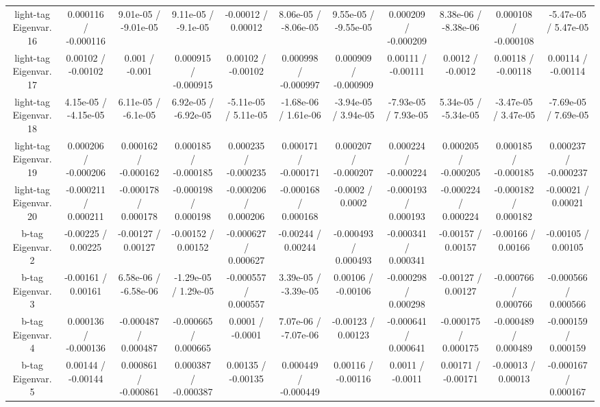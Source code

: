 \begin{table}[htbp]
\begin{center}
\begin{tabular}{|c|c|c|c|c|c|c|c|c|c|c|}
  light-tag Eigenvar. 16 & 0.000116 / -0.000116 & 9.01e-05 / -9.01e-05 & 9.11e-05 / -9.1e-05 & -0.00012 / 0.00012 & 8.06e-05 / -8.06e-05 & 9.55e-05 / -9.55e-05 & 0.000209 / -0.000209 & 8.38e-06 / -8.38e-06 & 0.000108 / -0.000108 & -5.47e-05 / 5.47e-05 \\ 
  light-tag Eigenvar. 17 & 0.00102 / -0.00102 & 0.001 / -0.001 & 0.000915 / -0.000915 & 0.00102 / -0.00102 & 0.000998 / -0.000997 & 0.000909 / -0.000909 & 0.00111 / -0.00111 & 0.0012 / -0.0012 & 0.00118 / -0.00118 & 0.00114 / -0.00114 \\ 
  light-tag Eigenvar. 18 & 4.15e-05 / -4.15e-05 & 6.11e-05 / -6.1e-05 & 6.92e-05 / -6.92e-05 & -5.11e-05 / 5.11e-05 & -1.68e-06 / 1.61e-06 & -3.94e-05 / 3.94e-05 & -7.93e-05 / 7.93e-05 & 5.34e-05 / -5.34e-05 & -3.47e-05 / 3.47e-05 & -7.69e-05 / 7.69e-05 \\ 
  light-tag Eigenvar. 19 & 0.000206 / -0.000206 & 0.000162 / -0.000162 & 0.000185 / -0.000185 & 0.000235 / -0.000235 & 0.000171 / -0.000171 & 0.000207 / -0.000207 & 0.000224 / -0.000224 & 0.000205 / -0.000205 & 0.000185 / -0.000185 & 0.000237 / -0.000237 \\ 
  light-tag Eigenvar. 20 & -0.000211 / 0.000211 & -0.000178 / 0.000178 & -0.000198 / 0.000198 & -0.000206 / 0.000206 & -0.000168 / 0.000168 & -0.0002 / 0.0002 & -0.000193 / 0.000193 & -0.000224 / 0.000224 & -0.000182 / 0.000182 & -0.00021 / 0.00021 \\ 
  b-tag Eigenvar. 2 & -0.00225 / 0.00225 & -0.00127 / 0.00127 & -0.00152 / 0.00152 & -0.000627 / 0.000627 & -0.00244 / 0.00244 & -0.000493 / 0.000493 & -0.000341 / 0.000341 & -0.00157 / 0.00157 & -0.00166 / 0.00166 & -0.00105 / 0.00105 \\ 
  b-tag Eigenvar. 3 & -0.00161 / 0.00161 & 6.58e-06 / -6.58e-06 & -1.29e-05 / 1.29e-05 & -0.000557 / 0.000557 & 3.39e-05 / -3.39e-05 & 0.00106 / -0.00106 & -0.000298 / 0.000298 & -0.00127 / 0.00127 & -0.000766 / 0.000766 & -0.000566 / 0.000566 \\ 
  b-tag Eigenvar. 4 & 0.000136 / -0.000136 & -0.000487 / 0.000487 & -0.000665 / 0.000665 & 0.0001 / -0.0001 & 7.07e-06 / -7.07e-06 & -0.00123 / 0.00123 & -0.000641 / 0.000641 & -0.000175 / 0.000175 & -0.000489 / 0.000489 & -0.000159 / 0.000159 \\ 
  b-tag Eigenvar. 5 & 0.00144 / -0.00144 & 0.000861 / -0.000861 & 0.000387 / -0.000387 & 0.00135 / -0.00135 & 0.000449 / -0.000449 & 0.00116 / -0.00116 & 0.0011 / -0.0011 & 0.00171 / -0.00171 & -0.00013 / 0.00013 & -0.000167 / 0.000167 \\ 

\end{tabular}
\end{center}
\end{table}
